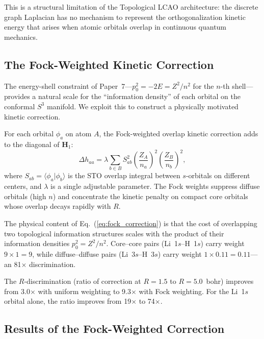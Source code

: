 \documentclass[aps,pra,twocolumn,superscriptaddress,longbibliography]{revtex4-2}
\begin{document}
This is a structural limitation of the Topological LCAO architecture:
the discrete graph Laplacian has no mechanism to represent the
orthogonalization kinetic energy that arises when atomic orbitals
overlap in continuous quantum mechanics.

\subsection{The Fock-Weighted Kinetic Correction}
\label{sec:fock_correction}

The energy-shell constraint of Paper~7---$p_0^2 = -2E = Z^2/n^2$ for
the $n$-th shell---provides a natural scale for the
``information density'' of each orbital on the conformal $S^3$ manifold.
We exploit this to construct a physically motivated kinetic correction.

For each orbital $\phi_a$ on atom $A$, the Fock-weighted overlap
kinetic correction adds to the diagonal of $\mathbf{H}_1$:
\begin{equation}
\Delta h_{aa} = \lambda \sum_{b \in B}
S_{ab}^2 \left(\frac{Z_A}{n_a}\right)^2
\left(\frac{Z_B}{n_b}\right)^2,
\label{eq:fock_correction}
\end{equation}
where $S_{ab} = \langle \phi_a | \phi_b \rangle$ is the STO overlap
integral between $s$-orbitals on different centers, and $\lambda$ is a
single adjustable parameter.  The Fock weights suppress diffuse
orbitals (high $n$) and concentrate the kinetic penalty on compact core
orbitals whose overlap decays rapidly with $R$.

The physical content of Eq.~(\ref{eq:fock_correction}) is that the cost
of overlapping two topological information structures scales with the
product of their information densities $p_0^2 = Z^2/n^2$.  Core--core
pairs (Li~1$s$--H~1$s$) carry weight $9 \times 1 = 9$, while
diffuse--diffuse pairs (Li~3$s$--H~3$s$) carry weight
$1 \times 0.11 = 0.11$---an 81$\times$ discrimination.

The $R$-discrimination (ratio of correction at $R=1.5$ to $R=5.0$~bohr)
improves from 3.0$\times$ with uniform weighting to 9.3$\times$ with
Fock weighting.  For the Li~1$s$ orbital alone, the ratio improves from
19$\times$ to 74$\times$.

\subsection{Results of the Fock-Weighted Correction}
\label{sec:fock_results}
\end{document}

